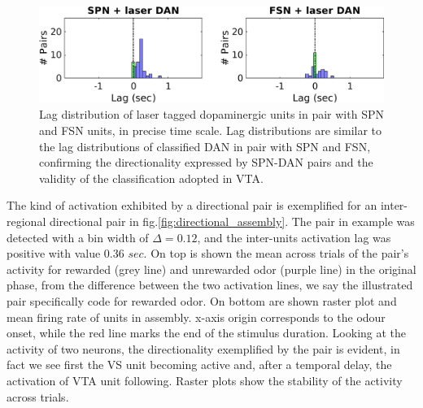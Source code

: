 \begin{figure}[H]
\centering
\includegraphics[scale=0.5]{figures/LagSecLaser3VS.png}
\caption{Lag distribution of laser tagged dopaminergic units in pair with SPN and FSN units, in precise time scale. Lag distributions are similar to the lag distributions of classified DAN in pair with SPN and FSN, confirming the directionality expressed by SPN-DAN pairs and the validity of the classification adopted in VTA.}
\label{fig:LagInSecLaser}
\end{figure}
The kind of activation exhibited by a directional pair is exemplified for an inter-regional directional pair in fig.\ref{fig:directional_assembly}. The pair in example was detected with a bin width of $\Delta = 0.12$, and the inter-units activation lag was positive with value 0.36 $sec$. On top is shown the mean across trials of the pair's activity for rewarded (grey line) and unrewarded odor (purple line) in the original phase, from the difference between the two activation lines, we say the illustrated pair specifically code for rewarded odor. On bottom are shown raster plot and mean firing rate of units in assembly. x-axis origin corresponds to the odour onset, while the red line marks the end of the stimulus duration.
Looking at the activity of two neurons, the directionality exemplified by the pair is evident, in fact we see first the VS unit becoming active and, after a temporal delay, the activation of VTA unit following. Raster plots show the stability of the activity across trials.\\ 
